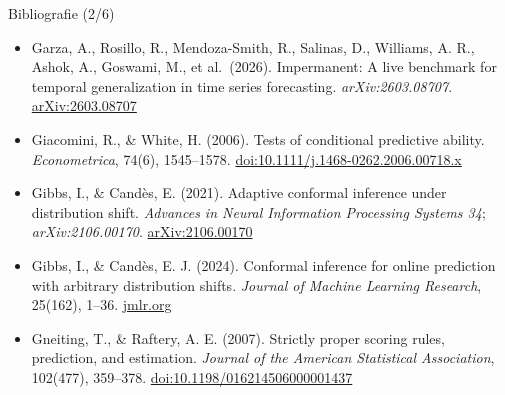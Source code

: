 \begin{frame}{Bibliografie (2/6)}
\begin{itemize}
    \item Garza, A., Rosillo, R., Mendoza-Smith, R., Salinas, D., Williams, A. R., Ashok, A., Goswami, M., et al.\ (2026). Impermanent: A live benchmark for temporal generalization in time series forecasting. \textit{arXiv:2603.08707}. \href{https://arxiv.org/abs/2603.08707}{arXiv:2603.08707}
    \item Giacomini, R., \& White, H. (2006). Tests of conditional predictive ability. \textit{Econometrica}, 74(6), 1545--1578. \href{https://doi.org/10.1111/j.1468-0262.2006.00718.x}{doi:10.1111/j.1468-0262.2006.00718.x}
    \item Gibbs, I., \& Candès, E. (2021). Adaptive conformal inference under distribution shift. \textit{Advances in Neural Information Processing Systems 34}; \textit{arXiv:2106.00170}. \href{https://arxiv.org/abs/2106.00170}{arXiv:2106.00170}
    \item Gibbs, I., \& Candès, E. J. (2024). Conformal inference for online prediction with arbitrary distribution shifts. \textit{Journal of Machine Learning Research}, 25(162), 1--36. \href{https://jmlr.org/papers/v25/22-1218.html}{jmlr.org}
    \item Gneiting, T., \& Raftery, A. E. (2007). Strictly proper scoring rules, prediction, and estimation. \textit{Journal of the American Statistical Association}, 102(477), 359--378. \href{https://doi.org/10.1198/016214506000001437}{doi:10.1198/016214506000001437}
\end{itemize}
\end{frame}

